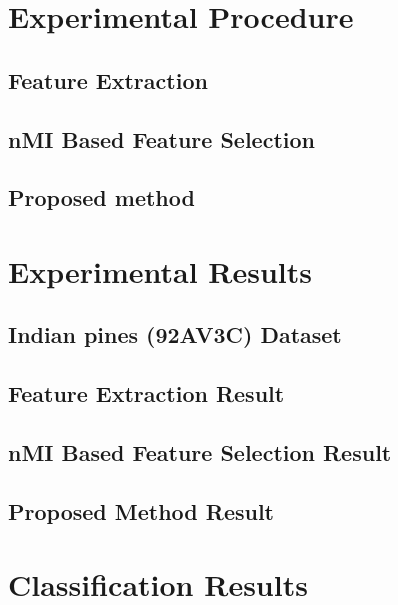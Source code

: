 \documentclass[document.tex]{subfiles}
\begin{document}
\section{Experimental Procedure}

\subsection{Feature Extraction}

\subsection{nMI Based Feature Selection}

\subsection{Proposed method}

\section{Experimental Results}

\subsection{Indian pines (92AV3C) Dataset}
\subsection{Feature Extraction Result}
\subsection{nMI Based Feature Selection Result}
\subsection{Proposed Method Result}
\section{Classification Results}
\end{document}
